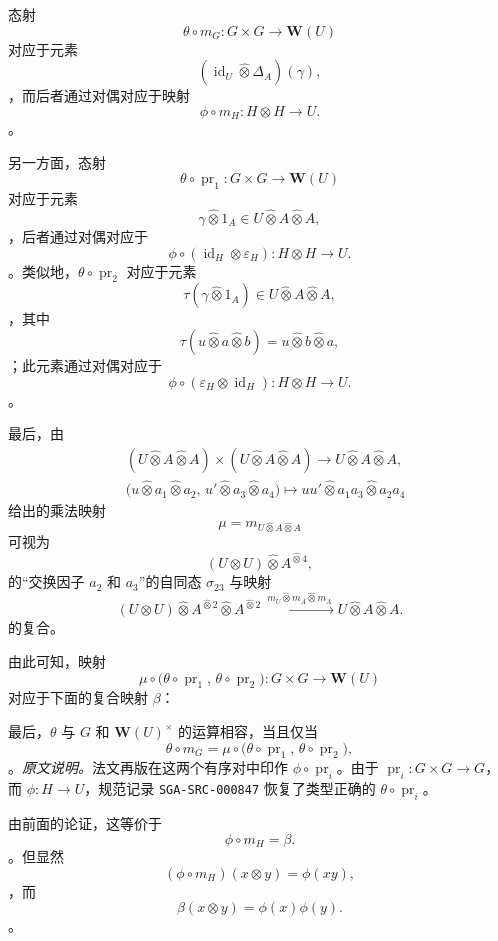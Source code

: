 态射 \[
  \theta\circ m_G:G\times G\longrightarrow\mathbf W(U)
\] 对应于元素 \[
  (\operatorname{id}_U\widehat\otimes\Delta_A)(\gamma),
\]，而后者通过对偶对应于映射 \[
  \phi\circ m_H:H\otimes H\longrightarrow U.
\]。

另一方面，态射 \[
  \theta\circ\operatorname{pr}_1:
  G\times G\longrightarrow\mathbf W(U)
\] 对应于元素 \[
  \gamma\widehat\otimes1_A
  \in
  U\widehat\otimes A\widehat\otimes A,
\]，后者通过对偶对应于 \[
  \phi\circ(\operatorname{id}_H\otimes\varepsilon_H):
  H\otimes H\longrightarrow U.
\]。类似地，\(\theta\circ\operatorname{pr}_2\) 对应于元素 \[
  \tau(\gamma\widehat\otimes1_A)
  \in
  U\widehat\otimes A\widehat\otimes A,
\]，其中 \[
  \tau(u\widehat\otimes a\widehat\otimes b)
  =
  u\widehat\otimes b\widehat\otimes a,
\]；此元素通过对偶对应于 \[
  \phi\circ(\varepsilon_H\otimes\operatorname{id}_H):
  H\otimes H\longrightarrow U.
\]。

最后，由 \[
\begin{aligned}
  &(U\widehat\otimes A\widehat\otimes A)
   \times
   (U\widehat\otimes A\widehat\otimes A)
  \longrightarrow
  U\widehat\otimes A\widehat\otimes A,
  \\
  &\bigl(
    u\widehat\otimes a_1\widehat\otimes a_2,\,
    u'\widehat\otimes a_3\widehat\otimes a_4
  \bigr)
  \longmapsto
  uu'\widehat\otimes a_1a_3\widehat\otimes a_2a_4
\end{aligned}
\] 给出的乘法映射 \[
  \mu=m_{U\widehat\otimes A\widehat\otimes A}
\] 可视为 \[
  (U\otimes U)\widehat\otimes A^{\widehat\otimes4},
\] 的“交换因子 \(a_2\) 和 \(a_3\)”的自同态 \(\sigma_{23}\) 与映射 \[
  (U\otimes U)
  \widehat\otimes A^{\widehat\otimes2}
  \widehat\otimes A^{\widehat\otimes2}
  \xrightarrow{\ m_U\widehat\otimes m_A\widehat\otimes m_A\ }
  U\widehat\otimes A\widehat\otimes A.
\] 的复合。

由此可知，映射 \[
  \mu\circ
  \bigl(\theta\circ\operatorname{pr}_1,\,
        \theta\circ\operatorname{pr}_2\bigr):
  G\times G\longrightarrow\mathbf W(U)
\] 对应于下面的复合映射 \(\beta\)：\begin{center} \label{sga3:VIIB:2.3.2:beta-diagram} \end{center}

最后，\(\theta\) 与 \(G\) 和 \(\mathbf W(U)^\times\) 的运算相容，当且仅当 \[
  \theta\circ m_G
  =
  \mu\circ
  \bigl(\theta\circ\operatorname{pr}_1,\,
        \theta\circ\operatorname{pr}_2\bigr),
\]。\noindent\textit{原文说明。}\enspace 法文再版在这两个有序对中印作 \(\phi\circ\operatorname{pr}_i\)。由于 \(\operatorname{pr}_i:G\times G\to G\)，而 \(\phi:H\to U\)，规范记录 \texttt{SGA-SRC-000847} 恢复了类型正确的 \(\theta\circ\operatorname{pr}_i\)。

由前面的论证，这等价于 \[
  \phi\circ m_H=\beta.
\]。但显然 \[
  (\phi\circ m_H)(x\otimes y)=\phi(xy),
\]，而 \[
  \beta(x\otimes y)=\phi(x)\phi(y).
\]。
